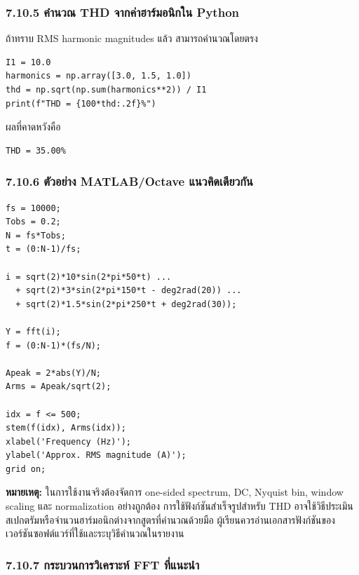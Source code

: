 \subsubsection{7.10.5 คำนวณ THD จากค่าฮาร์มอนิกใน Python}

ถ้าทราบ RMS harmonic magnitudes แล้ว สามารถคำนวณโดยตรง

\begin{verbatim}
I1 = 10.0
harmonics = np.array([3.0, 1.5, 1.0])
thd = np.sqrt(np.sum(harmonics**2)) / I1
print(f"THD = {100*thd:.2f}%")
\end{verbatim}

ผลที่คาดหวังคือ

\begin{verbatim}
THD = 35.00%
\end{verbatim}

\subsubsection{7.10.6 ตัวอย่าง MATLAB/Octave แนวคิดเดียวกัน}

\begin{verbatim}
fs = 10000;
Tobs = 0.2;
N = fs*Tobs;
t = (0:N-1)/fs;

i = sqrt(2)*10*sin(2*pi*50*t) ...
  + sqrt(2)*3*sin(2*pi*150*t - deg2rad(20)) ...
  + sqrt(2)*1.5*sin(2*pi*250*t + deg2rad(30));

Y = fft(i);
f = (0:N-1)*(fs/N);

Apeak = 2*abs(Y)/N;
Arms = Apeak/sqrt(2);

idx = f <= 500;
stem(f(idx), Arms(idx));
xlabel('Frequency (Hz)');
ylabel('Approx. RMS magnitude (A)');
grid on;
\end{verbatim}

\textbf{หมายเหตุ:} ในการใช้งานจริงต้องจัดการ one-sided spectrum, DC, Nyquist bin, window scaling และ normalization อย่างถูกต้อง การใช้ฟังก์ชันสำเร็จรูปสำหรับ THD อาจใช้วิธีประเมินสเปกตรัมหรือจำนวนฮาร์มอนิกต่างจากสูตรที่คำนวณด้วยมือ ผู้เรียนควรอ่านเอกสารฟังก์ชันของเวอร์ชันซอฟต์แวร์ที่ใช้และระบุวิธีคำนวณในรายงาน

\subsubsection{7.10.7 กระบวนการวิเคราะห์ FFT ที่แนะนำ}

